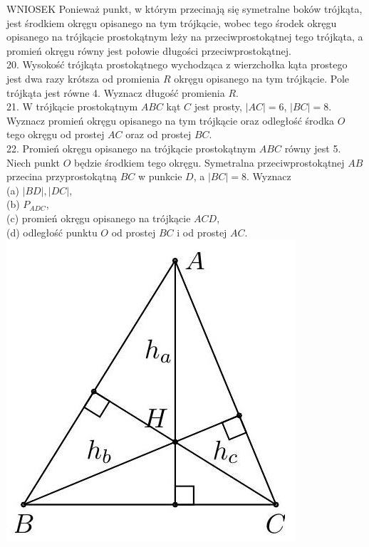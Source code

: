 \documentclass[10pt]{article}
\begin{document}
WNIOSEK Ponieważ punkt, w którym przecinają się symetralne boków trójkąta, jest środkiem okręgu opisanego na tym trójkącie, wobec tego środek okręgu opisanego na trójkącie prostokątnym leży na przeciwprostokątnej tego trójkąta, a promień okręgu równy jest połowie długości przeciwprostokątnej.\\
20. Wysokość trójkąta prostokątnego wychodząca z wierzchołka kąta prostego jest dwa razy krótsza od promienia \(R\) okręgu opisanego na tym trójkącie. Pole trójkąta jest równe 4. Wyznacz długość promienia \(R\).\\
21. W trójkącie prostokątnym \(A B C\) kąt \(C\) jest prosty, \(|A C|=6\), \(|B C|=8\). Wyznacz promień okręgu opisanego na tym trójkącie oraz odległość środka \(O\) tego okręgu od prostej \(A C\) oraz od prostej \(B C\).\\
22. Promień okręgu opisanego na trójkącie prostokątnym \(A B C\) równy jest 5. Niech punkt \(O\) będzie środkiem tego okręgu. Symetralna przeciwprostokątnej \(A B\) przecina przyprostokątną \(B C\) w punkcie \(D\), a \(|B C|=8\). Wyznacz\\
(a) \(|B D|,|D C|\),\\
(b) \(P_{A D C}\),\\
(c) promień okręgu opisanego na trójkącie \(A C D\),\\
(d) odległość punktu \(O\) od prostej \(B C\) i od prostej \(A C\).\\
\includegraphics[max width=\textwidth, center]{2024_11_21_71f62bd117d375398909g-157(1)}
\end{document}
